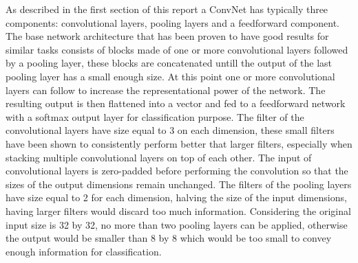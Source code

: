 \documentclass[12pt]{article}
\begin{document}
As described in the first section of this report a ConvNet has typically three components: convolutional layers, pooling layers and a feedforward component. The base network architecture that has been proven to have good results for similar tasks consists of blocks made of one or more convolutional layers followed by  a pooling layer, these blocks are concatenated untill the output of the last pooling layer has a small enough size. At this point one or more convolutional layers can follow to increase the representational power of the network. The resulting output is then flattened into a vector and fed to a feedforward network with a softmax output layer for classification purpose. The filter of the convolutional layers have size equal to 3 on each dimension, these small filters have been shown to consistently perform better that larger filters, especially when stacking multiple convolutional layers on top of each other. The input of convolutional layers is zero-padded before performing the convolution so that the sizes of the output dimensions remain unchanged. The filters of the pooling layers have size equal to 2 for each dimension, halving the size of the input dimensions, having larger filters would discard too much information. Considering the original input size is 32 by 32, no more than two pooling layers can be applied, otherwise the output would be smaller than 8 by 8 which would be too small to convey enough information for classification.
\end{document}

